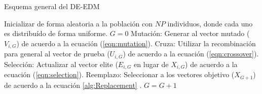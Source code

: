 \begin{algorithm}[t]
  \scriptsize
	\caption{Esquema general del DE-EDM} 
	\begin{algorithmic}[1]
	\STATE Inicializar de forma aleatoria a la población con $NP$ individuos, donde cada uno es distribuído de forma uniforme.
	\STATE $G=0$
		\STATE Mutación: Generar al vector mutado ($V_{i,G}$) de acuerdo a la ecuación (\ref{eqn:mutation}).
		\STATE Cruza: Utilizar la recombinación para general al vector de prueba ($U_{i,G}$) de acuerdo a la ecuación (\ref{eqn:crossover}).
		\STATE Selección: Actualizar al vector elite ($E_{i,G}$ en lugar de $X_{i,G}$) de acuerdo a la ecuación (\ref{eqn:selection}).
	   \ENDFOR
		\STATE Reemplazo: Seleccionar a los vectores objetivo ($X_{G+1}$) de acuerdo a la ecuación \ref{alg:Replacement} .
	   \STATE $G=G+1$
	\ENDWHILE
\end{algorithmic}
    \label{alg:DEEDM}
\end{algorithm}


